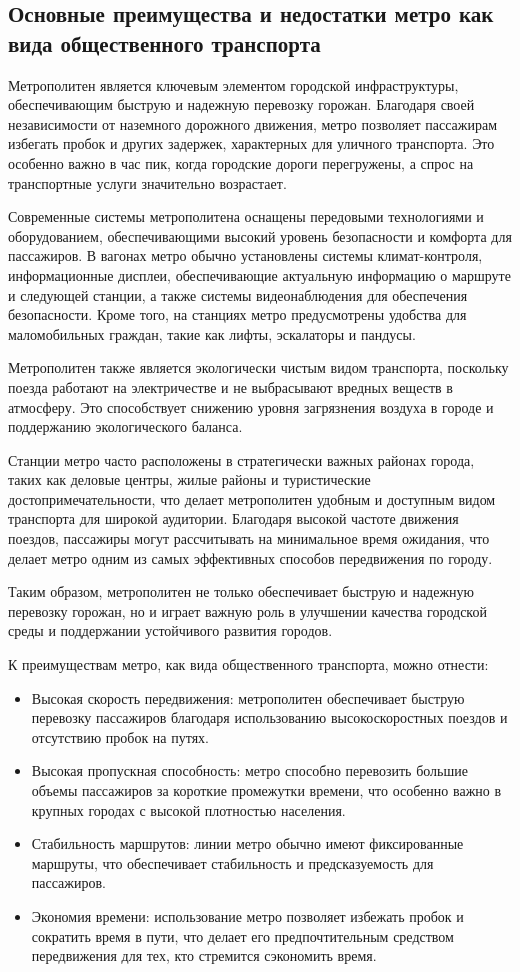 \subsection{Основные преимущества и недостатки метро как вида общественного транспорта}

Метрополитен является ключевым элементом городской инфраструктуры, обеспечивающим быструю и надежную перевозку горожан. Благодаря своей независимости от наземного дорожного движения, метро позволяет пассажирам избегать пробок и других задержек, характерных для уличного транспорта. Это особенно важно в час пик, когда городские дороги перегружены, а спрос на транспортные услуги значительно возрастает.

Современные системы метрополитена оснащены передовыми технологиями и оборудованием, обеспечивающими высокий уровень безопасности и комфорта для пассажиров. В вагонах метро обычно установлены системы климат-контроля, информационные дисплеи, обеспечивающие актуальную информацию о маршруте и следующей станции, а также системы видеонаблюдения для обеспечения безопасности. Кроме того, на станциях метро предусмотрены удобства для маломобильных граждан, такие как лифты, эскалаторы и пандусы.

Метрополитен также является экологически чистым видом транспорта, поскольку поезда работают на электричестве и не выбрасывают вредных веществ в атмосферу. Это способствует снижению уровня загрязнения воздуха в городе и поддержанию экологического баланса. 

Станции метро часто расположены в стратегически важных районах города, таких как деловые центры, жилые районы и туристические достопримечательности, что делает метрополитен удобным и доступным видом транспорта для широкой аудитории. Благодаря высокой частоте движения поездов, пассажиры могут рассчитывать на минимальное время ожидания, что делает метро одним из самых эффективных способов передвижения по городу.

Таким образом, метрополитен не только обеспечивает быструю и надежную перевозку горожан, но и играет важную роль в улучшении качества городской среды и поддержании устойчивого развития городов.

К преимуществам метро, как вида общественного транспорта, можно отнести:
\begin{itemize}
	\item Высокая скорость передвижения: метрополитен обеспечивает быструю перевозку пассажиров благодаря использованию высокоскоростных поездов и отсутствию пробок на путях.
	\item Высокая пропускная способность: метро способно перевозить большие объемы пассажиров за короткие промежутки времени, что особенно важно в крупных городах с высокой плотностью населения.
	\item Стабильность маршрутов: линии метро обычно имеют фиксированные маршруты, что обеспечивает стабильность и предсказуемость для пассажиров.
	\item Экономия времени: использование метро позволяет избежать пробок и сократить время в пути, что делает его предпочтительным средством передвижения для тех, кто стремится сэкономить время.
\end{itemize}

